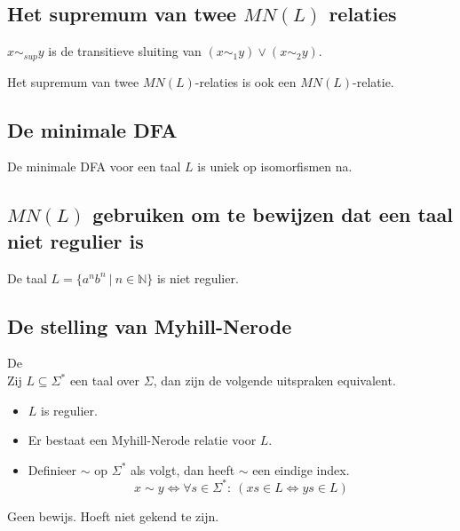 \documentclass[main.tex]{subfiles}
\begin{document}
\subsection{Het supremum van twee $MN(L)$ relaties}
\label{sec:het-supremum-van}

\begin{de}
  $x\sim_{sup} y$ is de transitieve sluiting van $(x \sim_{1} y) \vee (x \sim_{2} y)$.
\end{de}

\begin{st}
  Het supremum van twee $MN(L)$-relaties is ook een $MN(L)$-relatie.

\end{st}

\subsection{De minimale DFA}
\label{sec:de-minimale-dfa}

\begin{st}
  De minimale DFA voor een taal $L$ is uniek op isomorfismen na.

\end{st}

\subsection{$MN(L)$ gebruiken om te bewijzen dat een taal niet regulier is}
\label{sec:mnl-gebruiken-om}

\begin{st}
  De taal $L= \{ a^{n}b^{n} \ |\ n\in \mathbb{N} \} $ is niet regulier.

\end{st}

\subsection{De stelling van Myhill-Nerode}
\label{sec:de-stelling-van}

\begin{st}
  De \\
  Zij $L\subseteq \Sigma^{*}$ een taal over $\Sigma$, dan zijn de volgende uitspraken equivalent.
  \begin{itemize}
  \item $L$ is regulier.
  \item Er bestaat een Myhill-Nerode relatie voor $L$.
  \item Definieer $\sim$ op $\Sigma^{*}$ als volgt, dan heeft $\sim$ een eindige index.
    \[ x \sim y \Leftrightarrow \forall s \in \Sigma^{*}:\ (xs \in L \Leftrightarrow ys \in L) \]
  \end{itemize}
  Geen bewijs. Hoeft niet gekend te zijn.
\end{st}
\end{document}
